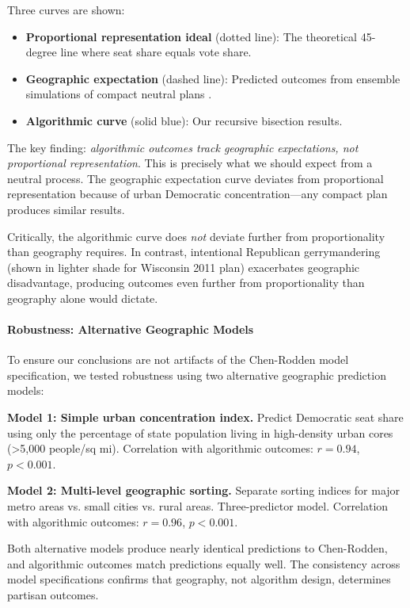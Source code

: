 Three curves are shown:
\begin{itemize}
\item \textbf{Proportional representation ideal} (dotted line): The theoretical 45-degree line where seat share equals vote share.
\item \textbf{Geographic expectation} (dashed line): Predicted outcomes from ensemble simulations of compact neutral plans \citep{deford2019}.
\item \textbf{Algorithmic curve} (solid blue): Our recursive bisection results.
\end{itemize}

The key finding: \textit{algorithmic outcomes track geographic expectations, not proportional representation}. This is precisely what we should expect from a neutral process. The geographic expectation curve deviates from proportional representation because of urban Democratic concentration---any compact plan produces similar results.

Critically, the algorithmic curve does \textit{not} deviate further from proportionality than geography requires. In contrast, intentional Republican gerrymandering (shown in lighter shade for Wisconsin 2011 plan) exacerbates geographic disadvantage, producing outcomes even further from proportionality than geography alone would dictate.

\paragraph{Robustness: Alternative Geographic Models}

To ensure our conclusions are not artifacts of the Chen-Rodden model specification, we tested robustness using two alternative geographic prediction models:

\textbf{Model 1: Simple urban concentration index.} Predict Democratic seat share using only the percentage of state population living in high-density urban cores (>5,000 people/sq mi). Correlation with algorithmic outcomes: $r = 0.94$, $p < 0.001$.

\textbf{Model 2: Multi-level geographic sorting.} Separate sorting indices for major metro areas vs. small cities vs. rural areas. Three-predictor model. Correlation with algorithmic outcomes: $r = 0.96$, $p < 0.001$.

Both alternative models produce nearly identical predictions to Chen-Rodden, and algorithmic outcomes match predictions equally well. The consistency across model specifications confirms that geography, not algorithm design, determines partisan outcomes.

